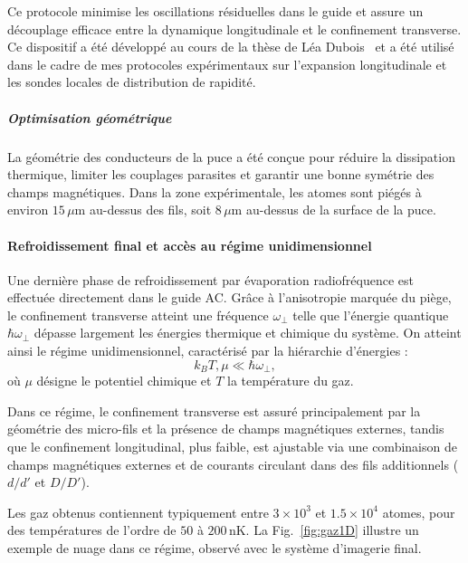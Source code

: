 Ce protocole minimise les oscillations résiduelles dans le guide et assure un découplage efficace entre la dynamique longitudinale et le confinement transverse. Ce dispositif a été développé au cours de la thèse de Léa Dubois~\cite{TheseLea} et a été utilisé dans le cadre de mes protocoles expérimentaux sur l’expansion longitudinale et les sondes locales de distribution de rapidité.

\subparagraph{Optimisation géométrique}
La géométrie des conducteurs de la puce a été conçue pour réduire la dissipation thermique, limiter les couplages parasites et garantir une bonne symétrie des champs magnétiques. Dans la zone expérimentale, les atomes sont piégés à environ \(15\,\mu\mathrm{m}\) au-dessus des fils, soit \(8\,\mu\mathrm{m}\) au-dessus de la surface de la puce.


\paragraph{Refroidissement final et accès au régime unidimensionnel}
Une dernière phase de refroidissement par évaporation radiofréquence est effectuée directement dans le guide AC. Grâce à l’anisotropie marquée du piège, le confinement transverse atteint une fréquence \(\omega_\perp\) telle que l’énergie quantique \(\hbar \omega_\perp\) dépasse largement les énergies thermique et chimique du système. On atteint ainsi le régime unidimensionnel, caractérisé par la hiérarchie d’énergies :
\[
k_B T, \mu \ll \hbar \omega_\perp,
\]
où \(\mu\) désigne le potentiel chimique et \(T\) la température du gaz.

Dans ce régime, le confinement transverse est assuré principalement par la géométrie des micro-fils et la présence de champs magnétiques externes, tandis que le confinement longitudinal, plus faible, est ajustable via une combinaison de champs magnétiques externes et de courants circulant dans des fils additionnels ($d/d'$ et $D/D'$). 

Les gaz obtenus contiennent typiquement entre \(3\times 10^3\) et \(1.5\times 10^4\) atomes, pour des températures de l’ordre de \(50\) à \(200\,\mathrm{nK}\). La Fig.~\ref{fig:gaz1D} illustre un exemple de nuage dans ce régime, observé avec le système d’imagerie final.





